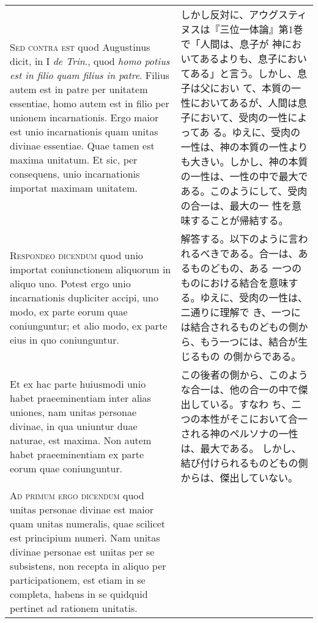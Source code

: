\documentclass[10pt]{jsarticle} %
\begin{document}
\begin{longtable}{p{21em}p{21em}}
\\



{\scshape Sed contra est} quod Augustinus dicit, in I {\itshape de
Trin}., quod {\itshape homo potius est in filio quam filius in
patre}. Filius autem est in patre per unitatem essentiae, homo autem
est in filio per unionem incarnationis. Ergo maior est unio
incarnationis quam unitas divinae essentiae. Quae tamen est maxima
unitatum. Et sic, per consequens, unio incarnationis importat maximam
unitatem.


&

しかし反対に、アウグスティヌスは『三位一体論』第1巻で「人間は、息子が
神においてあるよりも、息子においてある」と言う。しかし、息子は父におい
て、本質の一性においてあるが、人間は息子において、受肉の一性によってあ
る。ゆえに、受肉の一性は、神の本質の一性よりも大きい。しかし、神の本質
の一性は、一性の中で最大である。このようにして、受肉の合一は、最大の一
性を意味することが帰結する。

\\



{\scshape Respondeo dicendum} quod unio importat coniunctionem
aliquorum in aliquo uno. Potest ergo unio incarnationis dupliciter
accipi, uno modo, ex parte eorum quae coniunguntur; et alio modo, ex
parte eius in quo coniunguntur.


&

解答する。以下のように言われるべきである。合一は、あるものどもの、ある
一つのものにおける結合を意味する。ゆえに、受肉の一性は、二通りに理解で
き、一つには結合されるものどもの側から、もう一つには、結合が生じるもの
の側からである。


\\

Et ex hac parte huiusmodi unio habet praeeminentiam inter alias
uniones, nam unitas personae divinae, in qua uniuntur duae naturae,
est maxima. Non autem habet praeeminentiam ex parte eorum quae
coniunguntur.


&

この後者の側から、このような合一は、他の合一の中で傑出している。すなわ
ち、二つの本性がそこにおいて合一される神のペルソナの一性は、最大である。
しかし、結び付けられるものどもの側からは、傑出していない。


\\



{\scshape Ad primum ergo dicendum} quod unitas personae divinae est
maior quam unitas numeralis, quae scilicet est principium numeri. Nam
unitas divinae personae est unitas per se subsistens, non recepta in
aliquo per participationem, est etiam in se completa, habens in se
quidquid pertinet ad rationem unitatis.



\end{longtable}
\end{document}
